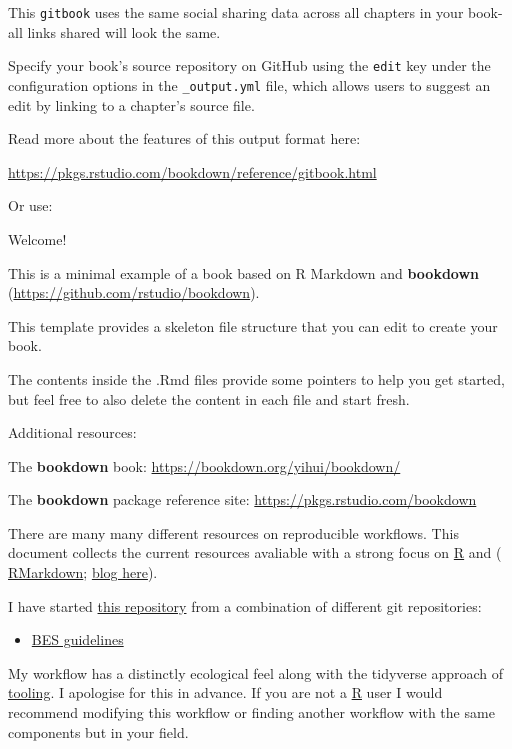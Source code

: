 \documentclass[
]{book}
\providecommand{\tightlist}{%
  \setlength{\itemsep}{0pt}\setlength{\parskip}{0pt}}
\theoremstyle{definition}
\theoremstyle{definition}
\theoremstyle{definition}
\theoremstyle{definition}
\theoremstyle{remark}
\begin{document}
This \texttt{gitbook} uses the same social sharing data across all chapters in your book- all links shared will look the same.

Specify your book's source repository on GitHub using the \texttt{edit} key under the configuration options in the \texttt{\_output.yml} file, which allows users to suggest an edit by linking to a chapter's source file.

Read more about the features of this output format here:

\url{https://pkgs.rstudio.com/bookdown/reference/gitbook.html}

Or use:

Welcome!

This is a minimal example of a book based on R Markdown and \textbf{bookdown} (\url{https://github.com/rstudio/bookdown}).

This template provides a skeleton file structure that you can edit to create your book.

The contents inside the .Rmd files provide some pointers to help you get started, but feel free to also delete the content in each file and start fresh.

Additional resources:

The \textbf{bookdown} book: \url{https://bookdown.org/yihui/bookdown/}

The \textbf{bookdown} package reference site: \url{https://pkgs.rstudio.com/bookdown}

There are many many different resources on reproducible workflows. This document collects the current resources avaliable with a strong focus on \href{https://cran.r-project.org/}{R} and ( \href{https://rmarkdown.rstudio.com/}{RMarkdown}; \href{https://www.r-bloggers.com/composing-reproducible-manuscripts-using-r-markdown/}{blog here}).

I have started \href{}{this repository} from a combination of different git repositories:

\begin{itemize}
\tightlist
\item
  \href{https://github.com/BES2016Workshop/guidebook}{BES guidelines}
\end{itemize}

My workflow has a distinctly ecological feel along with the tidyverse approach of \href{https://style.tidyverse.org/index.html}{tooling}. I apologise for this in advance.
If you are not a \href{https://cran.r-project.org/}{R} user I would recommend modifying this workflow or finding another workflow with the same components but in your field.
\end{document}
